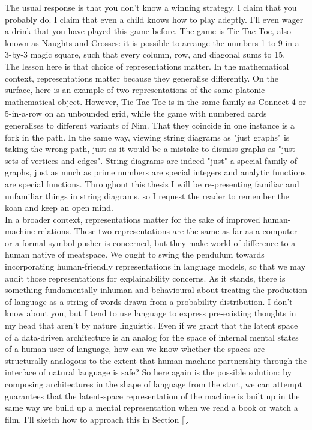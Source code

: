 The usual response is that you don't know a winning strategy. I claim that you probably do. I claim that even a child knows how to play adeptly. I'll even wager a drink that you have played this game before. The game is Tic-Tac-Toe, also known as Naughts-and-Crosses: it is possible to arrange the numbers 1 to 9 in a 3-by-3 magic square, such that every column, row, and diagonal sums to 15.\\

The lesson here is that choice of representations matter. In the mathematical context, representations matter because they generalise differently. On the surface, here is an example of two representations of the same platonic mathematical object. However, Tic-Tac-Toe is in the same family as Connect-4 or 5-in-a-row on an unbounded grid, while the game with numbered cards generalises to different variants of Nim. That they coincide in one instance is a fork in the path. In the same way, viewing string diagrams as "just graphs" is taking the wrong path, just as it would be a mistake to dismiss graphs as "just sets of vertices and edges". String diagrams are indeed "just" a special family of graphs, just as much as prime numbers are special integers and analytic functions are special functions. Throughout this thesis I will be re-presenting familiar and unfamiliar things in string diagrams, so I request the reader to remember the koan and keep an open mind.\\

In a broader context, representations matter for the sake of improved human-machine relations. These two representations are the same as far as a computer or a formal symbol-pusher is concerned, but they make world of difference to a human native of meatspace. We ought to swing the pendulum towards incorporating human-friendly representations in language models, so that we may audit those representations for explainability concerns. As it stands, there is something fundamentally inhuman and behavioural about treating the production of language as a string of words drawn from a probability distribution. I don't know about you, but I tend to use language to express pre-existing thoughts in my head that aren't by nature linguistic. Even if we grant that the latent space of a data-driven architecture is an analog for the space of internal mental states of a human user of language, how can we know whether the spaces are structurally analogous to the extent that human-machine partnership through the interface of natural language is safe? So here again is the possible solution: by composing architectures in the shape of language from the start, we can attempt guarantees that the latent-space representation of the machine is built up in the same way we build up a mental representation when we read a book or watch a film. I'll sketch how to approach this in Section \ref{}.

